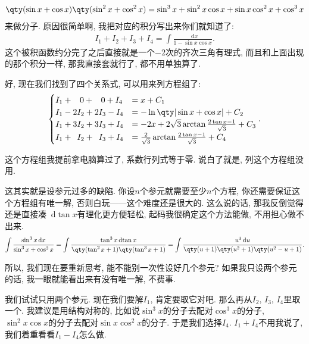 \documentclass{ctexbook}
\newcommand*{\dif}{\mathop{}\!\mathrm{d}}
\begin{document}
{\begin{align*}
\qty(\sin{x}+\cos{x})\qty(\sin^{2}{x}+\cos^{2}{x})=\sin^{3}{x}+\sin^{2}{x}\cos{x}+\sin{x}\cos^{2}{x}+\cos^{3}{x}
\end{align*}
来做分子. 原因很简单啊, 我把对应的积分写出来你们就知道了: 
\begin{align*}
I_{1}+I_{2}+I_{3}+I_{4}=\int\frac{\dif{x}}{1-\sin{x}\cos{x}}
.\end{align*}
这个被积函数约分完了之后直接就是一个$-2$次的齐次三角有理式, 而且和上面出现的那个积分一样, 那我直接套就行了, 都不用单独算了. \par
好, 现在我们找到了四个关系式, 可以用来列方程组了: 
\begin{align*}
\begin{cases}
I_{1}+\;\;\;0+\;\;\;0+I_{4}&=x+C_{1}\\
I_{1}-2I_{2}+2I_{3}-I_{4}&=-\ln\qty|\sin{x}+\cos{x}|+C_{2}\\
I_{1}+3I_{2}+3I_{3}+I_{4}&=-2x+2\sqrt{3}\arctan{\frac{2\tan{x}-1}{\sqrt{3}}}+C_{3}\\
I_{1}+\;\:I_{2}+\;\:I_{3}+I_{4}&=\frac{2}{\sqrt{3}}\arctan{\frac{2\tan{x}-1}{\sqrt{3}}}+C_{4}
\end{cases}
.\end{align*}\par
这个方程组我提前拿电脑算过了, 系数行列式等于零. 说白了就是, 列这个方程组没用. \par
这其实就是设参元过多的缺陷. 你设$n$个参元就需要至少$n$个方程, 你还需要保证这个方程组有唯一解, 否则白玩——这个难度还是很大的. 这么说的话, 那我反倒觉得还是直接凑$\dif{\tan{x}}$有理化更方便轻松, 起码我很确定这个方法能做, 不用担心做不出来. 
\begin{align*}
\int\frac{\sin^{3}{x}\dif{x}}{\sin^{3}{x}+\cos^{3}{x}}=\int\frac{\tan^{3}{x}\dif{\tan{x}}}{\qty(\tan^{2}{x}+1)\qty(\tan^{3}{x}+1)}=\int\frac{u^{3}\dif{u}}{\qty(u+1)\qty(u^{2}+1)\qty(u^{2}-u+1)}
.\end{align*}\par
所以, 我们现在要重新思考, 能不能别一次性设好几个参元? 如果我只设两个参元的话, 我一眼就能看出来有没有唯一解, 不费事. \par
我们试试只用两个参元. 现在我们要解$I_{1}$, 肯定要取它对吧. 那么再从$I_{2},\,I_{3},\,I_{4}$里取一个. 我建议是用结构对称的, 比如说$\sin^{3}{x}$的分子去配对$\cos^{3}{x}$的分子, $\sin^{2}{x}\cos{x}$的分子去配对$\sin{x}\cos^{2}{x}$的分子. 于是我们选择$I_{4}$. $I_{1}+I_{4}$不用我说了, 我们着重看看$I_{1}-I_{4}$怎么做. \par
\begin{align*}

\end{align*}}
\end{document}
